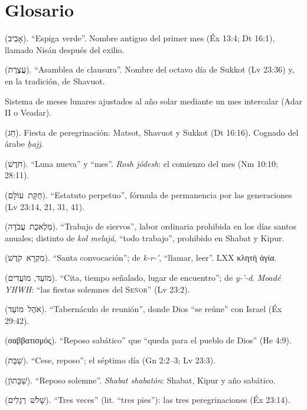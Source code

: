 \documentclass[11pt,letterpaper]{article}
\newcommand{\heb}[1]{\mbox{\foreignlanguage{hebrew}{#1}}}
\newcommand{\grc}[1]{\foreignlanguage{ancientgreek}{#1}}
\newcommand{\SENOR}{\textsc{Señor}}
\begin{document}
\section*{Glosario}
\begin{description}\setlength{\itemsep}{2pt}
\item[Abib] (\heb{אָבִיב}). ``Espiga verde''. Nombre antiguo del primer mes (Éx 13:4; Dt 16:1), llamado Nisán después del exilio.
\item[Atséret] (\heb{עֲצֶרֶת}). ``Asamblea de clausura''. Nombre del octavo día de Sukkot (Lv 23:36) y, en la tradición, de Shavuot.
\item[Calendario lunisolar] Sistema de meses lunares ajustados al año solar mediante un mes intercalar (Adar II o Veadar).
\item[Jag] (\heb{חַג}). Fiesta de peregrinación: Matsot, Shavuot y Sukkot (Dt 16:16). Cognado del árabe \emph{ḥajj}.
\item[Jódesh] (\heb{חֹדֶשׁ}). ``Luna nueva'' y ``mes''. \emph{Rosh jódesh}: el comienzo del mes (Nm 10:10; 28:11).
\item[Jukat olam] (\heb{חֻקַּת עוֹלָם}). ``Estatuto perpetuo'', fórmula de permanencia por las generaciones (Lv 23:14, 21, 31, 41).
\item[Melejet avodá] (\heb{מְלֶאכֶת עֲבֹדָה}). ``Trabajo de siervos'', labor ordinaria prohibida en los días santos anuales; distinto de \emph{kol melajá}, ``todo trabajo'', prohibido en Shabat y Kipur.
\item[Mikrá kódesh] (\heb{מִקְרָא קֹדֶשׁ}). ``Santa convocación''; de \emph{k-r-'}, ``llamar, leer''. LXX \grc{κλητὴ ἁγία}.
\item[Moed, moadim] (\heb{מוֹעֵד}, \heb{מוֹעֲדִים}). ``Cita, tiempo señalado, lugar de encuentro''; de \emph{y-'-d}. \emph{Moadé YHWH}: ``las fiestas solemnes del \SENOR'' (Lv 23:2).
\item[Óhel moed] (\heb{אֹהֶל מוֹעֵד}). ``Tabernáculo de reunión'', donde Dios ``se reúne'' con Israel (Éx 29:42).
\item[Sabbatismós] (\grc{σαββατισμός}). ``Reposo sabático'' que ``queda para el pueblo de Dios'' (He 4:9).
\item[Shabat] (\heb{שַׁבָּת}). ``Cese, reposo''; el séptimo día (Gn 2:2--3; Lv 23:3).
\item[Shabatón] (\heb{שַׁבָּתוֹן}). ``Reposo solemne''. \emph{Shabat shabatón}: Shabat, Kipur y año sabático.
\item[Shalosh regalim] (\heb{שָׁלֹשׁ רְגָלִים}). ``Tres veces'' (lit. ``tres pies''): las tres peregrinaciones (Éx 23:14).

\end{description}
\end{document}
